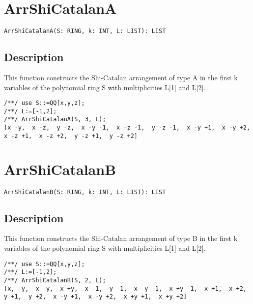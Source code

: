 \documentclass[a4paper]{mybook}
\newenvironment{command}{}{} %
\begin{document}
\section{ArrShiCatalanA}
\label{ArrShiCatalanA}
\begin{command} %


\begin{Verbatim}[label=syntax, rulecolor=\color{MidnightBlue},
frame=single]
ArrShiCatalanA(S: RING, k: INT, L: LIST): LIST 
\end{Verbatim}


\subsection*{Description}

This function constructs the Shi-Catalan arrangement of type A in the first k variables of the polynomial ring S with multiplicities L[1] and L[2].
\begin{Verbatim}[label=example, rulecolor=\color{PineGreen}, frame=single]
/**/ use S::=QQ[x,y,z];	
/**/ L:=[-1,2];
/**/ ArrShiCatalanA(S, 3, L);
[x -y,  x -z,  y -z,  x -y -1,  x -z -1,  y -z -1,  x -y +1,  x -y +2,  x -z +1,  x -z +2,  y -z +1,  y -z +2]
\end{Verbatim}


\end{command} %

\section{ArrShiCatalanB}
\label{ArrShiCatalanB}
\begin{command} %


\begin{Verbatim}[label=syntax, rulecolor=\color{MidnightBlue},
frame=single]
ArrShiCatalanB(S: RING, k: INT, L: LIST): LIST 
\end{Verbatim}


\subsection*{Description}

This function constructs the Shi-Catalan arrangement of type B in the first k variables of the polynomial ring S with multiplicities L[1] and L[2].
\begin{Verbatim}[label=example, rulecolor=\color{PineGreen}, frame=single]
/**/ use S::=QQ[x,y,z];
/**/ L:=[-1,2];	
/**/ ArrShiCatalanB(S, 2, L);
[x,  y,  x -y,  x +y,  x -1,  y -1,  x -y -1,  x +y -1,  x +1,  x +2,  y +1,  y +2,  x -y +1,  x -y +2,  x +y +1,  x +y +2]
\end{Verbatim}


\end{command} %
\end{document}
